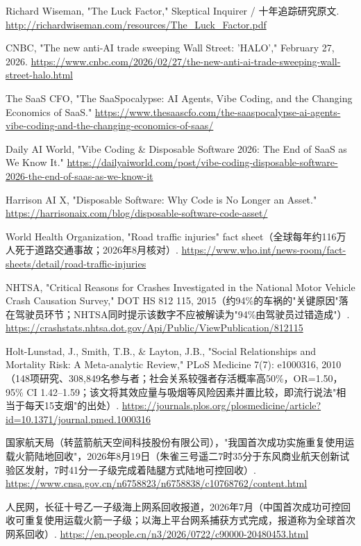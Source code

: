 \documentclass[11pt,a4paper]{ctexart}
\begin{document}
\noindent [130] Richard Wiseman, "The Luck Factor," Skeptical Inquirer / 十年追踪研究原文. \url{http://richardwiseman.com/resources/The\_Luck\_Factor.pdf}

\noindent [131] CNBC, "The new anti-AI trade sweeping Wall Street: 'HALO'," February 27, 2026. \url{https://www.cnbc.com/2026/02/27/the-new-anti-ai-trade-sweeping-wall-street-halo.html}

\noindent [132] The SaaS CFO, "The SaaSpocalypse: AI Agents, Vibe Coding, and the Changing Economics of SaaS." \url{https://www.thesaascfo.com/the-saaspocalypse-ai-agents-vibe-coding-and-the-changing-economics-of-saas/}

\noindent [133] Daily AI World, "Vibe Coding \& Disposable Software 2026: The End of SaaS as We Know It." \url{https://dailyaiworld.com/post/vibe-coding-disposable-software-2026-the-end-of-saas-as-we-know-it}

\noindent [134] Harrison AI X, "Disposable Software: Why Code is No Longer an Asset." \url{https://harrisonaix.com/blog/disposable-software-code-asset/}

\noindent [135] World Health Organization, "Road traffic injuries" fact sheet（全球每年约116万人死于道路交通事故；2026年8月核对）. \url{https://www.who.int/news-room/fact-sheets/detail/road-traffic-injuries}

\noindent [136] NHTSA, "Critical Reasons for Crashes Investigated in the National Motor Vehicle Crash Causation Survey," DOT HS 812 115, 2015（约94\%的车祸的"关键原因"落在驾驶员环节；NHTSA同时提示该数字不应被解读为"94\%由驾驶员过错造成"）. \url{https://crashstats.nhtsa.dot.gov/Api/Public/ViewPublication/812115}

\noindent [137] Holt-Lunstad, J., Smith, T.B., \& Layton, J.B., "Social Relationships and Mortality Risk: A Meta-analytic Review," PLoS Medicine 7(7): e1000316, 2010（148项研究、308,849名参与者；社会关系较强者存活概率高50\%，OR=1.50，95\% CI 1.42–1.59；该文将其效应量与吸烟等风险因素并置比较，即流行说法"相当于每天15支烟"的出处）. \url{https://journals.plos.org/plosmedicine/article?id=10.1371/journal.pmed.1000316}

\noindent [138] 国家航天局（转蓝箭航天空间科技股份有限公司），"我国首次成功实施重复使用运载火箭陆地回收"，2026年8月19日（朱雀三号遥二7时35分于东风商业航天创新试验区发射，7时41分一子级完成着陆腿方式陆地可控回收）. \url{https://www.cnsa.gov.cn/n6758823/n6758838/c10768762/content.html}

\noindent [139] 人民网，长征十号乙一子级海上网系回收报道，2026年7月（中国首次成功可控回收可重复使用运载火箭一子级；以海上平台网系捕获方式完成，报道称为全球首次网系回收）. \url{https://en.people.cn/n3/2026/0722/c90000-20480453.html}
\end{document}

